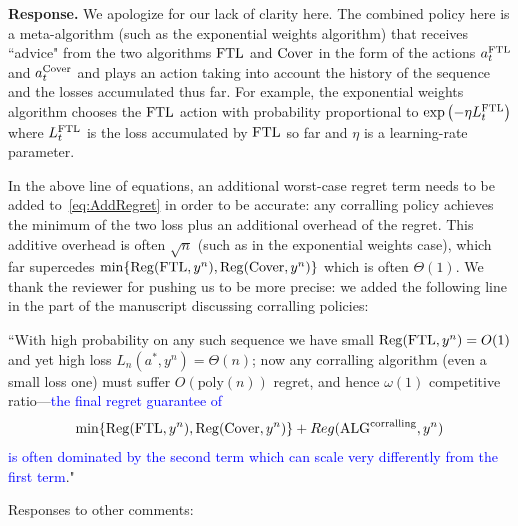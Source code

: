 \documentclass[11pt]{article}
\begin{document}
\begin{enumerate}
{\bf Response.} We apologize for our lack of clarity here. The combined policy here is a meta-algorithm (such as the exponential weights algorithm) that receives ``advice" from the two algorithms $\text{FTL}$ and $\text{Cover}$ in the form of the actions $a_t^{\text{FTL}}$ and $a_t^{\text{Cover}}$ and plays an action taking into account the history of the sequence and the losses accumulated thus far. For example, the exponential weights algorithm chooses the $\text{FTL}$ action with probability proportional to $\exp\left(-\eta L_t^{\text{FTL}}\right)$ where $L_t^{\text{FTL}}$ is the loss accumulated by $\text{FTL}$ so far and $\eta$ is a learning-rate parameter. 

In the above line of equations, an additional worst-case regret term needs to be added to~\eqref{eq:AddRegret} in order to be accurate: any corralling policy achieves the minimum of the two loss plus an additional overhead of the regret. This additive overhead is often $\sqrt{n}$ (such as in the exponential weights case), which far supercedes $\min\{\mathrm{Reg}(\text{FTL},y^n), \mathrm{Reg}(\text{Cover}, y^n)\}$ which is often $\Theta(1)$. We thank the reviewer for pushing us to be more precise: we added the following line in the part of the manuscript discussing corralling policies:

``With high probability on any such sequence we have small $\mathrm{Reg}(\text{FTL},y^n)=O(1)$ and yet high loss $L_n(a^*,y^n)=\Theta(n)$; now any corralling algorithm (even a small loss one) must suffer $O(\text{poly}(n))$ regret, and hence $\omega(1)$ competitive ratio---\textcolor{blue}{the final regret guarantee of 
\[
\min\{\mathrm{Reg}(\text{FTL}, y^n), \mathrm{Reg}(\text{Cover},y^n)\} + Reg(\text{ALG}^{\text{corralling}}, y^n)
\]
is often dominated by the second term which can scale very differently from the first term}."

\end{enumerate}

Responses to other comments:
\end{document}
